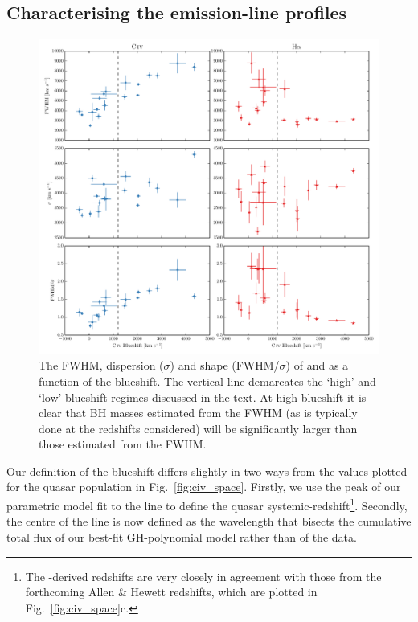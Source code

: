 \subsection{Characterising the emission-line profiles}
\label{sub:charemprof}

\begin{figure}
    \includegraphics[width=12cm]{figures/chapter02/civ_ha_comparisons.pdf} %
    \caption{The FWHM, dispersion ($\sigma$) and shape (FWHM/$\sigma$) of  and \ha as a function of the  blueshift. The vertical line demarcates the `high' and `low'  blueshift regimes discussed in the text. At high blueshift it is clear that BH masses estimated from the  FWHM (as is typically done at the redshifts considered) will be significantly larger than those estimated from the \ha FWHM.}
    \label{fig:line_comparison}
\end{figure} 

Our definition of the  blueshift differs slightly in two ways from the values plotted for the quasar population in Fig.~\ref{fig:civ_space}. 
Firstly, we use the peak of our parametric model fit to the \ha line to define the quasar systemic-redshift\footnote{The \hans-derived redshifts are very closely in agreement with those from the forthcoming Allen \& Hewett redshifts, which are plotted in Fig.~\ref{fig:civ_space}c.}.  
Secondly, the centre of the  line is now defined as the wavelength that bisects the cumulative total flux of our best-fit GH-polynomial model rather than of the data. 

